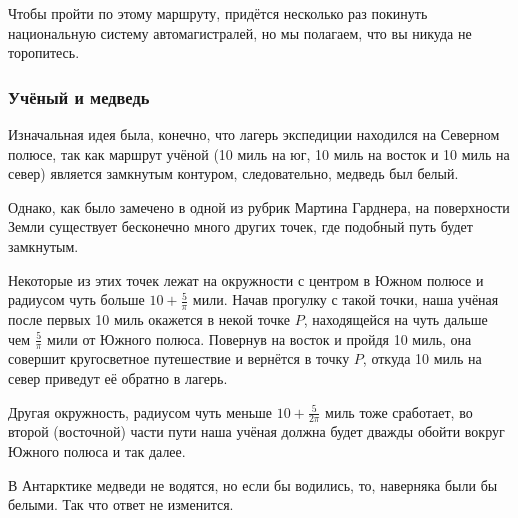 Чтобы пройти по этому маршруту, придётся несколько раз 
покинуть национальную систему автомагистралей, но мы полагаем, что вы никуда не торопитесь.

\subsubsection*{Учёный и медведь}%

Изначальная идея была, конечно, что лагерь экспедиции находился на Северном полюсе, так как маршрут учёной (10 миль на юг, 10 миль на восток и 10 миль на север) является замкнутым контуром, %
следовательно, медведь был белый.

Однако, как было замечено в одной из рубрик %
Мартина Гарднера, %
на поверхности Земли существует бесконечно много других точек, где подобный путь будет замкнутым.

Некоторые из этих точек лежат на окружности с центром в Южном полюсе и радиусом чуть больше $10 + \tfrac5\pi$ мили.
Начав прогулку с такой точки, наша учёная после первых 10 миль окажется в некой точке $P$, 
находящейся на чуть дальше чем $\tfrac5\pi$ мили от Южного полюса.
Повернув на восток и пройдя 10 миль, она совершит кругосветное путешествие и вернётся в точку $P$, откуда 10 миль на север приведут её обратно в лагерь.

Другая окружность, радиусом чуть меньше $10 + \tfrac5{2\pi}$ миль тоже сработает, во второй (восточной) части пути наша учёная должна будет дважды обойти вокруг Южного полюса и так далее.

В Антарктике медведи не водятся, но если бы водились, то, наверняка были бы белыми.
Так что ответ не изменится.\heart
